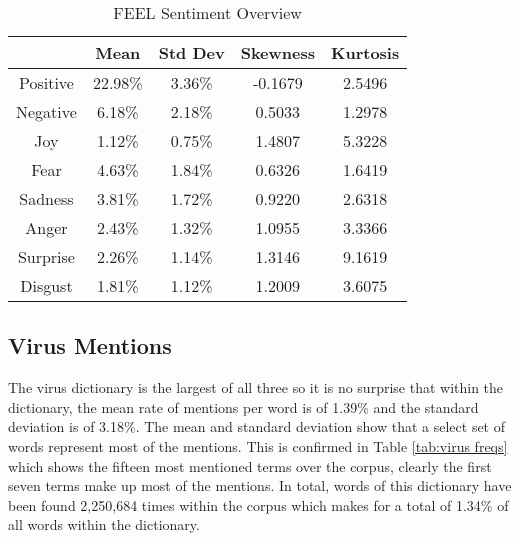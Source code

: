 \begin{table}[]
\caption{FEEL Sentiment Overview}
\label{tab:feel stats}
\centering
\begin{tabular}{@{}ccccc@{}}
\toprule
         & Mean    & Std Dev & Skewness & Kurtosis \\ \midrule
Positive & 22.98\% & 3.36\%  & -0.1679  & 2.5496   \\
Negative & 6.18\%  & 2.18\%  & 0.5033   & 1.2978   \\
Joy      & 1.12\%  & 0.75\%  & 1.4807   & 5.3228   \\
Fear     & 4.63\%  & 1.84\%  & 0.6326   & 1.6419   \\
Sadness  & 3.81\%  & 1.72\%  & 0.9220   & 2.6318   \\
Anger    & 2.43\%  & 1.32\%  & 1.0955   & 3.3366   \\
Surprise & 2.26\%  & 1.14\%  & 1.3146   & 9.1619   \\
Disgust  & 1.81\%  & 1.12\%  & 1.2009   & 3.6075   \\ \bottomrule
\end{tabular}
\end{table}

\subsection{Virus Mentions}

The virus dictionary is the largest of all three so it is no surprise that within the dictionary, the mean rate of mentions per word is of 1.39\% and the standard deviation is of 3.18\%. The mean and standard deviation show that a select set of words represent most of the mentions. This is confirmed in Table \ref{tab:virus freqs} which shows the fifteen most mentioned terms over the corpus, clearly the first seven terms make up most of the mentions. In total, words of this dictionary have been found 2,250,684 times within the corpus which makes for a total of 1.34\% of all words within the dictionary.

